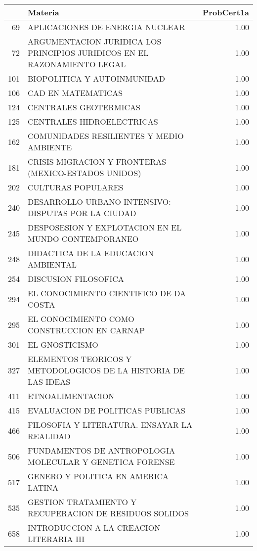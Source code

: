 \begin{table}[ht]
\centering
\begin{tabular}{rlr}
  \hline
 & Materia & ProbCert1a \\ 
  \hline
69 & APLICACIONES DE ENERGIA NUCLEAR & 1.00 \\ 
  72 & ARGUMENTACION JURIDICA LOS PRINCIPIOS JURIDICOS EN EL RAZONAMIENTO LEGAL & 1.00 \\ 
  101 & BIOPOLITICA Y AUTOINMUNIDAD & 1.00 \\ 
  106 & CAD EN MATEMATICAS & 1.00 \\ 
  124 & CENTRALES GEOTERMICAS & 1.00 \\ 
  125 & CENTRALES HIDROELECTRICAS & 1.00 \\ 
  162 & COMUNIDADES RESILIENTES Y MEDIO AMBIENTE & 1.00 \\ 
  181 & CRISIS MIGRACION Y FRONTERAS (MEXICO-ESTADOS UNIDOS) & 1.00 \\ 
  202 & CULTURAS POPULARES & 1.00 \\ 
  240 & DESARROLLO URBANO INTENSIVO: DISPUTAS POR LA CIUDAD & 1.00 \\ 
  245 & DESPOSESION Y EXPLOTACION EN EL MUNDO CONTEMPORANEO & 1.00 \\ 
  248 & DIDACTICA DE LA EDUCACION AMBIENTAL & 1.00 \\ 
  254 & DISCUSION FILOSOFICA & 1.00 \\ 
  294 & EL CONOCIMIENTO CIENTIFICO DE DA COSTA & 1.00 \\ 
  295 & EL CONOCIMIENTO COMO CONSTRUCCION EN CARNAP & 1.00 \\ 
  301 & EL GNOSTICISMO & 1.00 \\ 
  327 & ELEMENTOS TEORICOS Y METODOLOGICOS DE LA HISTORIA DE LAS IDEAS & 1.00 \\ 
  411 & ETNOALIMENTACION & 1.00 \\ 
  415 & EVALUACION DE POLITICAS PUBLICAS & 1.00 \\ 
  466 & FILOSOFIA Y LITERATURA. ENSAYAR LA REALIDAD & 1.00 \\ 
  506 & FUNDAMENTOS DE ANTROPOLOGIA MOLECULAR Y GENETICA FORENSE & 1.00 \\ 
  517 & GENERO Y POLITICA EN AMERICA LATINA & 1.00 \\ 
  535 & GESTION TRATAMIENTO Y RECUPERACION DE RESIDUOS SOLIDOS & 1.00 \\ 
  658 & INTRODUCCION A LA CREACION LITERARIA III & 1.00 \\ 

\end{tabular}
\end{table}
